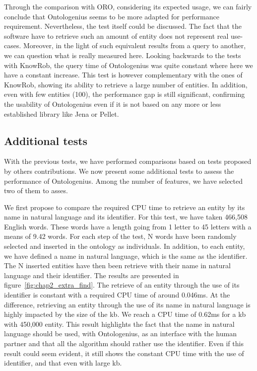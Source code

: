 Through the comparison with ORO, considering its expected usage, we can fairly conclude that Ontologenius seems to be more adapted for performance requirement. Nevertheless, the test itself could be discussed. The fact that the software have to retrieve such an amount of entity does not represent real use-cases. Moreover, in the light of such equivalent results from a query to another, we can question what is really measured here. Looking backwards to the tests with KnowRob, the query time of Ontologenius was quite constant where here we have a constant increase. This test is however complementary with the ones of KnowRob, showing its ability to retrieve a large number of entities. In addition, even with few entities (100), the performance gap is still significant, confirming the usability of Ontologenius even if it is not based on any more or less established library like Jena or Pellet. 

\subsection{Additional tests}

With the previous tests, we have performed comparisons based on tests proposed by others contributions. We now present some additional tests to assess the performance of Ontologenius. Among the number of features, we have selected two of them to asses.

We first propose to compare the required CPU time to retrieve an entity by its name in natural language and its identifier. For this test, we have taken 466,508 English words. These words have a length going from 1 letter to 45 letters with a means of  9.42 words. For each step of the test, N words have been randomly selected and inserted in the ontology as individuals. In addition, to each entity, we have defined a name in natural language, which is the same as the identifier. The N inserted entities have then been retrieve with their name in natural language and their identifier. The results are presented in figure~\ref{fig:chap2_extra_find}. The retrieve of an entity through the use of its identifier is constant with a required CPU time of around 0.046ms. At the difference, retrieving an entity through the use of its name in natural language is highly impacted by the size of the \acrshort{kb}. We reach a CPU time of 0.62ms for a \acrshort{kb} with 450,000 entity. This result highlights the fact that the name in natural language should be used, with Ontologenius, as an interface with the human partner and that all the algorithm should rather use the identifier. Even if this result could seem evident, it still shows the constant CPU time with the use of identifier, and that even with large \acrshort{kb}.

